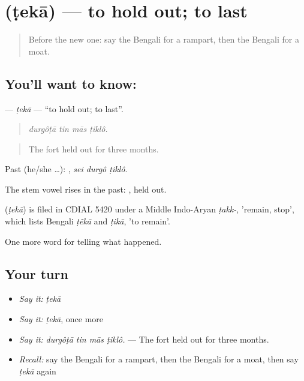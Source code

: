 \section[\texorpdfstring{\bn{টেকা} (ṭekā)}{টেকা (ṭekā)}]{ (ṭekā) — to hold out; to last}

\label{lesson:BN-C316-teka}



\begin{quote}
Before the new one: say the Bengali for a rampart, then the Bengali for a moat.
\end{quote}

\subsection*{You'll want to know: }
\textbf{} — \emph{ṭekā} — \textquotedblleft{}to hold out; to last\textquotedblright{}.

\begin{quote}
   
\end{quote}

\begin{quote}
\emph{durgôṭā tin mās ṭiklô.}
\end{quote}

\begin{quote}
The fort held out for three months.
\end{quote}

Past (he/she …):   , \emph{sei durgô ṭiklô}.

The stem vowel rises in the past: , held out.

\begin{cousinweb}
\textbf{} (\emph{ṭekā}) is filed in CDIAL 5420 under a Middle Indo-Aryan \emph{ṭakk-}, 'remain, stop', which lists Bengali \emph{ṭẽkā} and \emph{ṭikā}, 'to remain'.
\end{cousinweb}

\begin{grammarlens}[title={What you've built}]
One more word for telling what happened.
\end{grammarlens}

\subsection*{Your turn}
\begin{itemize}
\raggedright
  \item \emph{Say it:} \emph{ṭekā}
  \item \emph{Say it:} \emph{ṭekā}, once more
  \item \emph{Say it:} \emph{durgôṭā tin mās ṭiklô.} — The fort held out for three months.
  \item \emph{Recall:} say the Bengali for a rampart, then the Bengali for a moat, then say \emph{ṭekā} again
\end{itemize}

